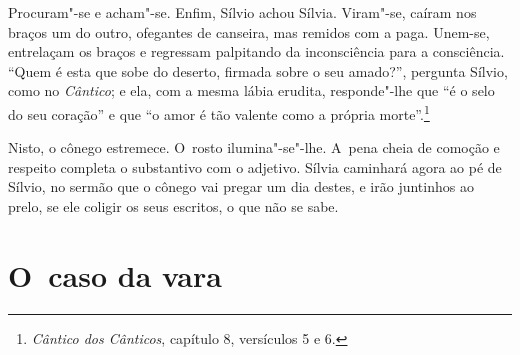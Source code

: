 \begin{linenumbers}
Procuram"-se e acham"-se. Enfim, Sílvio achou Sílvia. Viram"-se, caíram nos
braços um do outro, ofegantes de canseira, mas remidos com a paga. Unem-se,
entrelaçam os braços e regressam palpitando da inconsciência para a
consciência. ``Quem é esta que sobe do deserto, firmada sobre o seu
amado?'', pergunta Sílvio, como no \emph{Cântico}; e ela, com a mesma
lábia erudita, responde"-lhe que ``é o selo do seu coração'' e que ``o
amor é tão valente como a própria morte''.\footnote{\emph{Cântico dos
  Cânticos}, capítulo 8, versículos 5 e 6.}

Nisto, o cônego estremece. O~rosto ilumina"-se"-lhe. A~pena cheia de
comoção e respeito completa o substantivo com o adjetivo. Sílvia
caminhará agora ao pé de Sílvio, no sermão que o cônego vai pregar um
dia destes, e irão juntinhos ao prelo, se ele coligir os seus escritos,
o que não se sabe.

\end{linenumbers}

\chapter{O~caso da vara}

